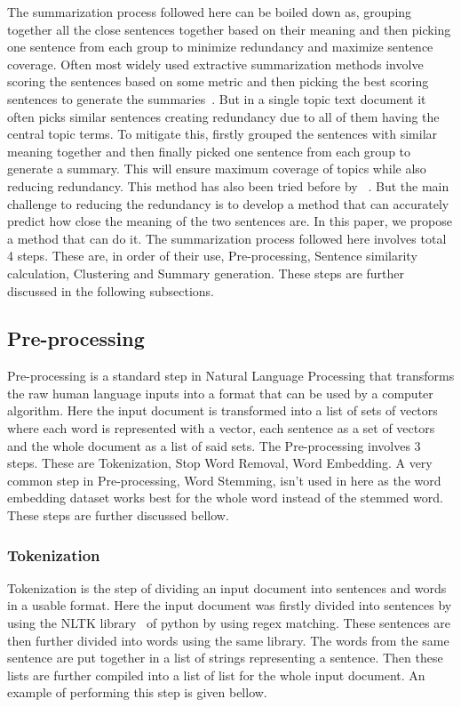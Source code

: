 The summarization process followed here can be boiled down as, grouping together all the close sentences
together based on their meaning and then picking one sentence from each group to minimize redundancy
and maximize sentence coverage.
Often most widely used extractive summarization methods involve scoring the sentences based on some metric and
then picking the best scoring sentences to generate the summaries~\cite{das-2022-tfidf,sarkar-2012-tfidf}.
But in a single topic text document it often picks similar sentences creating redundancy due to all of them having the
central topic terms.
To mitigate this, firstly grouped the sentences with similar meaning together and then finally picked one
sentence from each group to generate a summary.
This will ensure maximum coverage of topics while also reducing redundancy.
This method has also been tried before by \citeauthor{roychowdhury-etal-2022-spectral-base}~\cite{roychowdhury-etal-2022-spectral-base}.
But the main challenge to reducing the redundancy is to develop a method that can accurately predict how close the
meaning of the two sentences are.
In this paper, we propose a method that can do it.
The summarization process followed here involves total 4 steps.
These are, in order of their use, Pre-processing, Sentence similarity calculation, Clustering and Summary generation.
These steps are further discussed in the following subsections.

\subsection{Pre-processing}\label{subsec:pre-processing}
Pre-processing is a standard step in Natural Language Processing that transforms the raw human language
inputs into a format that can be used by a computer algorithm.
Here the input document is transformed into a list of sets of vectors where each word is represented
with a vector, each sentence as a set of vectors and the whole document as a list of said sets.
The Pre-processing involves 3 steps.
These are Tokenization, Stop Word Removal, Word Embedding.
A very common step in Pre-processing, Word Stemming, isn't used in here as the word embedding dataset
works best for the whole word instead of the stemmed word.
These steps are further discussed bellow.

\subsubsection{Tokenization}
Tokenization is the step of dividing an input document into sentences and words in a usable format.
Here the input document was firstly divided into sentences by using the NLTK library~\cite{Bird-2009-nltk} of
python by using regex matching.
These sentences are then further divided into words using the same library.
The words from the same sentence are put together in a list of strings representing a sentence.
Then these lists are further compiled into a list of list for the whole input document.
An example of performing this step is given bellow.\\

